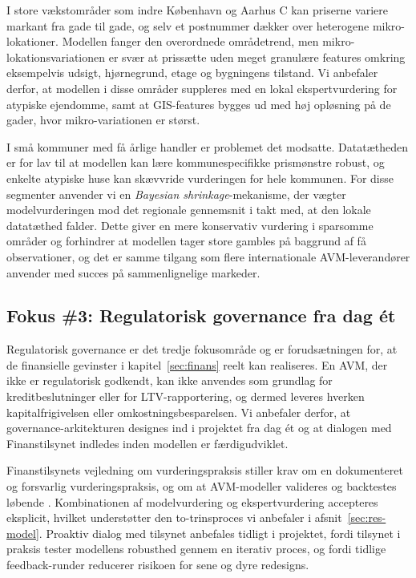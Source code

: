 \documentclass[12pt]{article}
\begin{document}
I store vækstområder som indre København og Aarhus C kan priserne variere markant fra gade til gade, og selv et postnummer dækker over heterogene mikro-lokationer. Modellen fanger den overordnede områdetrend, men mikro-lokationsvariationen er svær at prissætte uden meget granulære features omkring eksempelvis udsigt, hjørnegrund, etage og bygningens tilstand. Vi anbefaler derfor, at modellen i disse områder suppleres med en lokal ekspertvurdering for atypiske ejendomme, samt at GIS-features bygges ud med høj opløsning på de gader, hvor mikro-variationen er størst.

I små kommuner med få årlige handler er problemet det modsatte. Datatætheden er for lav til at modellen kan lære kommunespecifikke prismønstre robust, og enkelte atypiske huse kan skævvride vurderingen for hele kommunen. For disse segmenter anvender vi en \textit{Bayesian shrinkage}-mekanisme, der vægter modelvurderingen mod det regionale gennemsnit i takt med, at den lokale datatæthed falder. Dette giver en mere konservativ vurdering i sparsomme områder og forhindrer at modellen tager store gambles på baggrund af få observationer, og det er samme tilgang som flere internationale AVM-leverandører anvender med succes på sammenlignelige markeder.

\subsection{Fokus \#3: Regulatorisk governance fra dag ét}
\label{sec:res-governance}
Regulatorisk governance er det tredje fokusområde og er forudsætningen for, at de finansielle gevinster i kapitel~\ref{sec:finans} reelt kan realiseres. En AVM, der ikke er regulatorisk godkendt, kan ikke anvendes som grundlag for kreditbeslutninger eller for LTV-rapportering, og dermed leveres hverken kapitalfrigivelsen eller omkostningsbesparelsen. Vi anbefaler derfor, at governance-arkitekturen designes ind i projektet fra dag ét og at dialogen med Finanstilsynet indledes inden modellen er færdigudviklet.

Finanstilsynets vejledning om vurderingspraksis stiller krav om en dokumenteret og forsvarlig vurderingspraksis, og om at AVM-modeller valideres og backtestes løbende \parencite{finanstilsynet2024}. Kombinationen af modelvurdering og ekspertvurdering accepteres eksplicit, hvilket understøtter den to-trinsproces vi anbefaler i afsnit~\ref{sec:res-model}. Proaktiv dialog med tilsynet anbefales tidligt i projektet, fordi tilsynet i praksis tester modellens robusthed gennem en iterativ proces, og fordi tidlige feedback-runder reducerer risikoen for sene og dyre redesigns.
\end{document}
